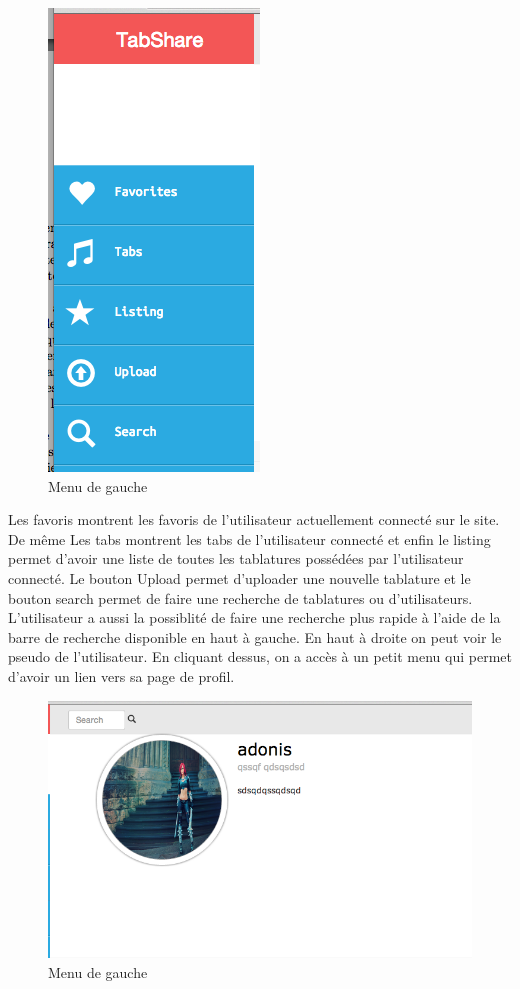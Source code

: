 \begin{figure}[H]
\centering
\includegraphics[scale=0.5]{leftWEB}
\caption{Menu de gauche}
\end{figure}

Les favoris montrent les favoris de l'utilisateur actuellement connecté sur le site. De même Les tabs montrent les tabs de l'utilisateur connecté et enfin le listing permet d'avoir une liste de toutes les tablatures possédées par l'utilisateur connecté. Le bouton Upload permet d'uploader une nouvelle tablature et le bouton search permet de faire une recherche de tablatures ou d'utilisateurs. L'utilisateur a aussi la possiblité de faire une recherche plus rapide à l'aide de la barre de recherche disponible en haut à gauche. En haut à droite on peut voir le pseudo de l'utilisateur. En cliquant dessus, on a accès à un petit menu qui permet d'avoir un lien vers sa page de profil. \\

\begin{figure}[H]
\centering
\includegraphics[scale=0.5]{centerWEB}
\caption{Menu de gauche}
\end{figure}

